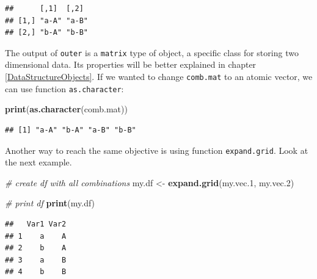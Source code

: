 \documentclass[11pt,]{book}
\newenvironment{Shaded}{\begin{snugshade}}{\end{snugshade}}
\newcommand{\KeywordTok}[1]{\textcolor[rgb]{0.27,0.27,0.27}{\textbf{#1}}}
\newcommand{\DataTypeTok}[1]{\textcolor[rgb]{0.27,0.27,0.27}{#1}}
\newcommand{\DecValTok}[1]{\textcolor[rgb]{0.06,0.06,0.06}{#1}}
\newcommand{\StringTok}[1]{\textcolor[rgb]{0.5,0.5,0.5}{#1}}
\newcommand{\CommentTok}[1]{\textcolor[rgb]{0.56,0.35,0.01}{\textit{#1}}}
\newcommand{\OperatorTok}[1]{\textcolor[rgb]{0.81,0.36,0.00}{\textbf{#1}}}
\newcommand{\NormalTok}[1]{#1}
\begin{document}
\begin{verbatim}
##      [,1]  [,2] 
## [1,] "a-A" "a-B"
## [2,] "b-A" "b-B"
\end{verbatim}

The output of \texttt{outer} is a \texttt{matrix} type of object, a
specific class for storing two dimensional data. Its properties will be
better explained in chapter \ref{DataStructureObjects}. If we wanted to
change \texttt{comb.mat} to an atomic vector, we can use function
\texttt{as.character}:

\begin{Shaded}
\begin{Highlighting}[]
\KeywordTok{print}\NormalTok{(}\KeywordTok{as.character}\NormalTok{(comb.mat))}
\end{Highlighting}
\end{Shaded}

\begin{verbatim}
## [1] "a-A" "b-A" "a-B" "b-B"
\end{verbatim}

Another way to reach the same objective is using function
\texttt{expand.grid}. Look at the next example.

\begin{Shaded}
\begin{Highlighting}[]
\CommentTok{# create df with all combinations}
\NormalTok{my.df <-}\StringTok{ }\KeywordTok{expand.grid}\NormalTok{(my.vec.}\DecValTok{1}\NormalTok{, my.vec.}\DecValTok{2}\NormalTok{)}

\CommentTok{# print df}
\KeywordTok{print}\NormalTok{(my.df)}
\end{Highlighting}
\end{Shaded}

\begin{verbatim}
##   Var1 Var2
## 1    a    A
## 2    b    A
## 3    a    B
## 4    b    B
\end{verbatim}

\begin{Shaded}
\end{Shaded}
\end{document}
